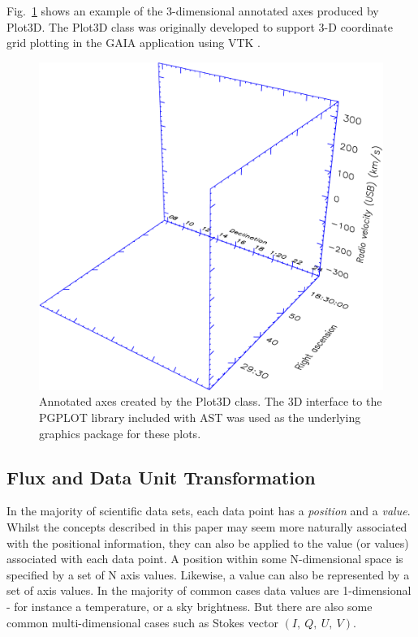 \documentclass[final,authoryear,5p,times,twocolumn]{elsarticle}
\begin{document}
Fig.~\ref{fig:3dplot} shows an example of the 3-dimensional annotated axes
produced by Plot3D. The Plot3D class was originally developed to
support 3-D coordinate grid plotting in the GAIA application \citep[][]{2008ASPC..394..339D}
using VTK \citep{Hanwell2015}.

\begin{figure}[h]
\centering
\includegraphics[width=\columnwidth]{3dplot}
\caption{Annotated axes created by the Plot3D class. The 3D interface to the
PGPLOT library included with AST was used as the underlying graphics package
for these plots.}
\label{fig:3dplot}
\end{figure}


\subsection{Flux and Data Unit Transformation}

In the majority of scientific data sets, each data point has a
\emph{position} and a \emph{value}. Whilst the concepts described in this
paper may seem more naturally associated with the positional information,
they can also be applied to the value (or values) associated with each
data point. A position within some N-dimensional space is specified by a
set of N axis values. Likewise, a value can also be represented by a set
of axis values. In the majority of common cases data values are
1-dimensional - for instance a temperature, or a sky brightness. But
there are also some common multi-dimensional cases such as Stokes vector
$(I,~Q,~U,~V)$.
\end{document}
